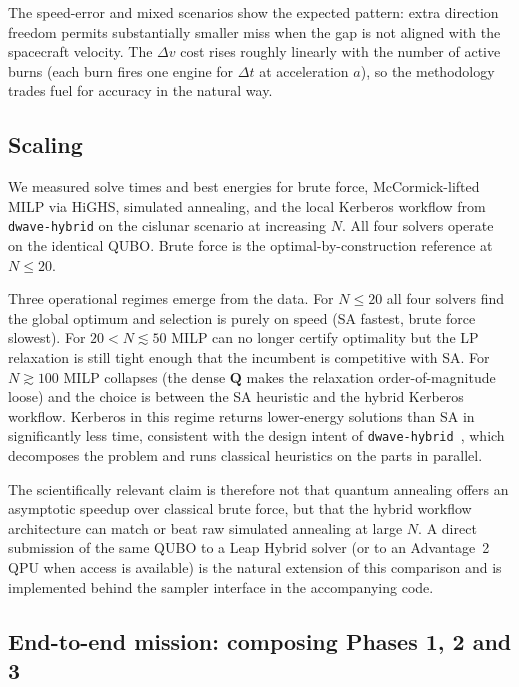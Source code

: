 \documentclass[11pt,a4paper]{article}
\theoremstyle{plain}
\newcommand{\bvec}[1]{\bm{#1}}
\newcommand{\Qmat}{\bvec{Q}}
\begin{document}
The speed-error and mixed scenarios show the expected pattern:
extra direction freedom permits substantially smaller miss when
the gap is not aligned with the spacecraft velocity. The
$\Delta v$ cost rises roughly linearly with the number of active
burns (each burn fires one engine for $\Delta t$ at acceleration
$a$), so the methodology trades fuel for accuracy in the natural
way. 

\subsection{Scaling}\label{sec:scaling}

We measured solve times and best
energies for brute force, McCormick-lifted MILP via HiGHS,
simulated annealing, and the local Kerberos workflow from
\texttt{dwave-hybrid} on the cislunar scenario at increasing $N$.
All four solvers operate on the identical QUBO. Brute force is
the optimal-by-construction reference at $N \le 20$.

Three operational regimes emerge from the data. For $N \le 20$
all four solvers find the global optimum and selection is purely
on speed (SA fastest, brute force slowest). For $20 < N \lesssim
50$ MILP can no longer certify optimality but the LP relaxation
is still tight enough that the incumbent is competitive with
SA. For $N \gtrsim 100$ MILP collapses (the dense $\Qmat$ makes
the relaxation order-of-magnitude loose) and the choice is
between the SA heuristic and the hybrid Kerberos workflow.
Kerberos in this regime returns lower-energy solutions than
SA in significantly less time, consistent with the design
intent of \texttt{dwave-hybrid}~\cite{DWave2024}, which
decomposes the problem and runs classical heuristics on the
parts in parallel.

The scientifically relevant claim is therefore not that quantum
annealing offers an asymptotic speedup over classical brute force, but that the hybrid workflow architecture can
match or beat raw simulated annealing at large $N$. A direct
submission of the same QUBO to a Leap Hybrid solver (or to an
Advantage~2 QPU when access is available) is the natural
extension of this comparison and is implemented behind the
sampler interface in the accompanying code.

\subsection{End-to-end mission: composing Phases 1, 2 and
  3}\label{sec:end-to-end}
\end{document}
